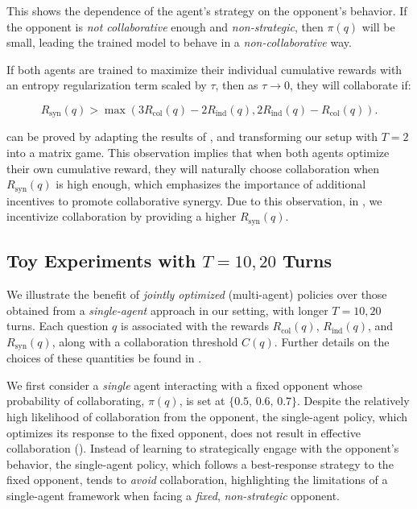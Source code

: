 This shows the dependence of the agent's strategy on the opponent's behavior. If the opponent is {\it not collaborative} enough  and {\it non-strategic}, then \( \pi(q) \) will be small, leading the trained model to behave in a  \textit{non-collaborative} way. 


\begin{observation}[Informal]  
\label{claim:2}
If both agents are trained to maximize their individual cumulative rewards with an entropy regularization term scaled by $\tau$, then as $\tau \to 0$, they will collaborate if:


\vspace{-6.2mm}
{\small
\[
R_{\text{syn}}(q) > \max( 3R_{\text{col}}(q) - 2R_{\text{ind}}(q), 2R_{\text{ind}}(q) - R_{\text{col}}(q)).
\]
}
\end{observation}  


\safevspace{-1.9mm}
{ can be proved by adapting the results of \citet{zhang2016quantal}, and transforming our setup with \(T=2\) into a matrix game.} This observation implies that when both agents optimize their own {cumulative} reward, they will naturally choose collaboration when \( R_{\text{syn}}(q) \) is high enough, which emphasizes the importance of additional incentives to promote collaborative synergy. Due to this observation, in , we incentivize collaboration by providing a higher \( R_{\text{syn}}(q) \).  


\safevspace{-2mm}


\subsection{Toy Experiments with \(T=10, 20\) Turns}
\label{ssec:exp-toy}
We illustrate the benefit of \textit{jointly optimized} (multi-agent) policies over {those obtained from a} \textit{single-agent} approach in our setting, with longer \(T=10, 20\) turns.  Each question \(q\) is associated with the  rewards \(R_{\text{col}}(q)\), \(R_{\text{ind}}(q)\), and \(R_{\text{syn}}(q)\), along with a collaboration threshold \(C(q)\).  Further details on the choices of these quantities be found in .

{We first consider a \textit{single} agent interacting with a fixed opponent whose probability of collaborating, \(\pi(q)\), is set at \(\{0.5,\,0.6,\,0.7\}\). Despite the relatively high likelihood of collaboration from the opponent, the single-agent policy, which optimizes its response to the fixed opponent, does not result in effective collaboration (). Instead of learning to strategically engage with the opponent’s behavior, the single-agent policy, which follows a best-response strategy to the fixed opponent, tends to \textit{avoid} collaboration, highlighting the limitations of a single-agent framework when facing a \emph{fixed}, \emph{non-strategic} opponent.}

